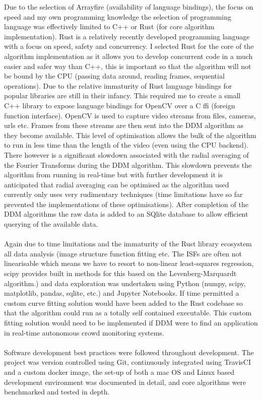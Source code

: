 \documentclass[11pt]{article}
\begin{document}
Due to the selection of Arrayfire (availability of language bindings), the focus on speed and my own programming knowledge the selection of programming language was effectively limited to C++ or Rust\cite{rust} (for core algorithm implementation). Rust is a relatively recently developed programming language with a focus on speed, safety and concurrency. I selected Rust for the core of the algorithm implementation as it allows you to develop concurrent code in a much easier and safer way than C++, this is important so that the algorithm will not be bound by the CPU (passing data around, reading frames, sequential operations). Due to the relative immaturity of Rust language bindings for popular libraries are still in their infancy. This required me to create a small C++ library to expose language bindings for OpenCV over a C ffi (foreign function interface). OpenCV is used to capture video streams from files, cameras, urls etc. Frames from these streams are then sent into the DDM algorithm as they become available. This level of optimisation allows the bulk of the algorithm to run in less time than the length of the video (even using the CPU backend). There however is a significant slowdown associated with the radial averaging of the Fourier Transforms during the DDM algorithm. This slowdown prevents the algorithm from running in real-time but with further development it is anticipated that radial averaging can be optimised as the algorithm used currently only uses very rudimentary techniques (time limitations have so far prevented the implementations of these optimisations). After completion of the DDM algorithms the raw data is added to an SQlite database to allow efficient querying of the available data.
\\\\
Again due to time limitations and the immaturity of the Rust library ecosystem all data analysis (image structure function fitting etc. The ISFs are often not linearisable which means we have to resort to non-linear least-squares regression, scipy provides built in methods for this based on the Levenberg-Marquardt  algorithm\cite{scipy_fit}.) and data exploration was undertaken using Python (numpy, scipy, matplotlib, pandas, sqlite, etc.) and Jupyter Notebooks. If time permitted a custom curve fitting solution would have been added to the Rust codebase so that the algorithm could run as a totally self contained executable. This custom fitting solution would need to be implemented if DDM were to find an application in real-time autonomous crowd monitoring systems.
\\\\
Software development best practices were followed throughout development. The project was version controlled using Git, continuously integrated using TravisCI and a custom docker image, the set-up of both a mac OS and Linux based development environment was documented in detail, and core algorithms were benchmarked and tested in depth.
\\\\
\end{document}

